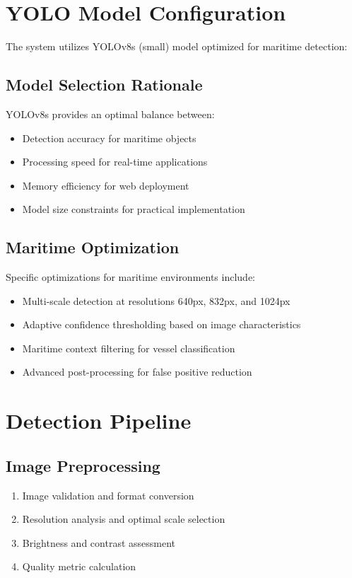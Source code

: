 \documentclass[12pt,a4paper]{report}
\begin{document}
\section{YOLO Model Configuration}
The system utilizes YOLOv8s (small) model optimized for maritime detection:

\subsection{Model Selection Rationale}
YOLOv8s provides an optimal balance between:
\begin{itemize}
    \item Detection accuracy for maritime objects
    \item Processing speed for real-time applications
    \item Memory efficiency for web deployment
    \item Model size constraints for practical implementation
\end{itemize}

\subsection{Maritime Optimization}
Specific optimizations for maritime environments include:
\begin{itemize}
    \item Multi-scale detection at resolutions 640px, 832px, and 1024px
    \item Adaptive confidence thresholding based on image characteristics
    \item Maritime context filtering for vessel classification
    \item Advanced post-processing for false positive reduction
\end{itemize}

\section{Detection Pipeline}

\subsection{Image Preprocessing}
\begin{enumerate}
    \item Image validation and format conversion
    \item Resolution analysis and optimal scale selection
    \item Brightness and contrast assessment
    \item Quality metric calculation
\end{enumerate}
\end{document}
